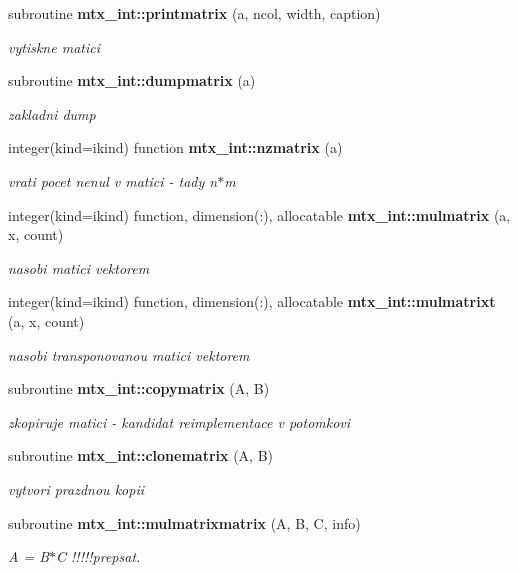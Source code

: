 \begin{DoxyCompactItemize}
subroutine {\bf mtx\+\_\+int\+::printmatrix} (a, ncol, width, caption)
\begin{DoxyCompactList}\small\item\em vytiskne matici \end{DoxyCompactList}\item 
subroutine {\bf mtx\+\_\+int\+::dumpmatrix} (a)
\begin{DoxyCompactList}\small\item\em zakladni dump \end{DoxyCompactList}\item 
integer(kind=ikind) function {\bf mtx\+\_\+int\+::nzmatrix} (a)
\begin{DoxyCompactList}\small\item\em vrati pocet nenul v matici -\/ tady n$\ast$m \end{DoxyCompactList}\item 
integer(kind=ikind) function, dimension(\+:), allocatable {\bf mtx\+\_\+int\+::mulmatrix} (a, x, count)
\begin{DoxyCompactList}\small\item\em nasobi matici vektorem \end{DoxyCompactList}\item 
integer(kind=ikind) function, dimension(\+:), allocatable {\bf mtx\+\_\+int\+::mulmatrixt} (a, x, count)
\begin{DoxyCompactList}\small\item\em nasobi transponovanou matici vektorem \end{DoxyCompactList}\item 
subroutine {\bf mtx\+\_\+int\+::copymatrix} (A, B)
\begin{DoxyCompactList}\small\item\em zkopiruje matici -\/ kandidat reimplementace v potomkovi \end{DoxyCompactList}\item 
subroutine {\bf mtx\+\_\+int\+::clonematrix} (A, B)
\begin{DoxyCompactList}\small\item\em vytvori prazdnou kopii \end{DoxyCompactList}\item 
subroutine {\bf mtx\+\_\+int\+::mulmatrixmatrix} (A, B, C, info)
\begin{DoxyCompactList}\small\item\em A = B$\ast$C !!!!!prepsat. \end{DoxyCompactList}\item 

\end{DoxyCompactItemize}
